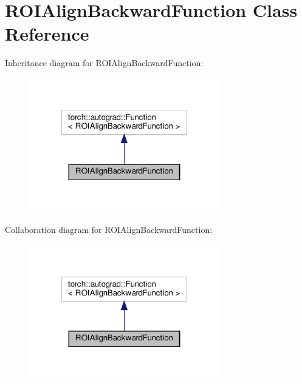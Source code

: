 \hypertarget{classROIAlignBackwardFunction}{}\section{R\+O\+I\+Align\+Backward\+Function Class Reference}
\label{classROIAlignBackwardFunction}


Inheritance diagram for R\+O\+I\+Align\+Backward\+Function\+:
\nopagebreak
\begin{figure}[H]
\begin{center}
\leavevmode
\includegraphics[width=235pt]{classROIAlignBackwardFunction__inherit__graph}
\end{center}
\end{figure}


Collaboration diagram for R\+O\+I\+Align\+Backward\+Function\+:
\nopagebreak
\begin{figure}[H]
\begin{center}
\leavevmode
\includegraphics[width=235pt]{classROIAlignBackwardFunction__coll__graph}
\end{center}
\end{figure}
